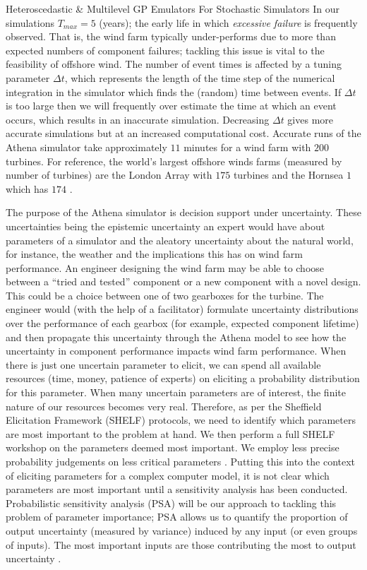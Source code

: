 \begin{chapter}{Heteroscedastic \& Multilevel GP Emulators For Stochastic Simulators\label{Ch:Hetsml}}
 In our simulations $T_{max} = 5$ (years); the early life in which \textit{excessive failure} is frequently observed. That is, the wind farm typically under-performs due to more than expected numbers of component failures; tackling this issue is vital to the feasibility of offshore wind. The number of event times is affected by a tuning parameter $\Delta t$, which represents the length of the time step of the numerical integration in the simulator which finds the (random) time between events. If $\Delta t$ is too large then we will frequently over estimate the time at which an event occurs, which results in an inaccurate simulation. Decreasing $\Delta t$ gives more accurate simulations but at an increased computational cost. Accurate runs of the Athena simulator take approximately $11$ minutes for a wind farm with $200$ turbines. For reference, the world's largest offshore winds farms (measured by number of turbines) are the London Array with $175$ turbines and the Hornsea $1$ which has $174$ \citep{Paterson2018, Vanhellemont2014}.

The purpose of the Athena simulator is decision support under uncertainty. These uncertainties being the epistemic uncertainty an expert would have about parameters of a simulator and the aleatory uncertainty about the natural world, for instance, the weather and the implications this has on wind farm performance. An engineer designing the wind farm may be able to choose between a ``tried and tested'' component or a new component with a novel design. This could be a choice between one of two gearboxes for the turbine. The engineer would (with the help of a facilitator) formulate uncertainty distributions over the performance of each gearbox (for example, expected component lifetime) and then propagate this uncertainty through the Athena model to see how the uncertainty in component performance impacts wind farm performance. When there is just one uncertain parameter to elicit, we can spend all available resources (time, money, patience of experts) on eliciting a probability distribution for this parameter. When many uncertain parameters are of interest, the finite nature of our resources becomes very real. Therefore, as per the Sheffield Elicitation Framework (SHELF) protocols, we need to identify which parameters are most important to the problem at hand. We then perform a full SHELF workshop on the parameters deemed most important. We employ less precise probability judgements on less critical parameters \citep{SHELF4}. Putting this into the context of eliciting parameters for a complex computer model, it is not clear which parameters are most important until a sensitivity analysis has been conducted. Probabilistic sensitivity analysis (PSA) will be our approach to tackling this problem of parameter importance; PSA allows us to quantify the proportion of output uncertainty (measured by variance) induced by any input (or even groups of inputs). The most important inputs are those contributing the most to output uncertainty \citep{Oakley04}.


\end{chapter}
